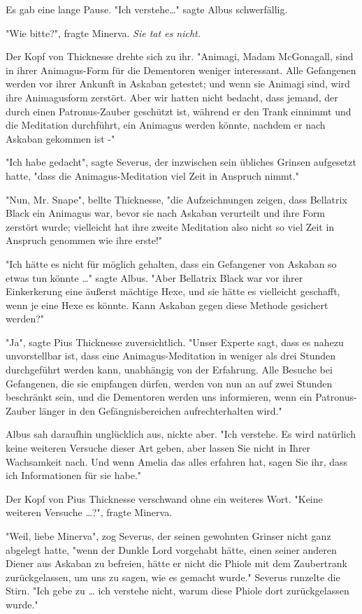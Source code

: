 {Es gab eine lange Pause. "Ich verstehe…" sagte Albus schwerfällig.

"Wie bitte?", fragte Minerva. \emph{Sie tat es nicht.}

Der Kopf von Thicknesse drehte sich zu ihr. "Animagi, Madam McGonagall, sind in ihrer Animagus-Form für die Dementoren weniger interessant. Alle Gefangenen werden vor ihrer Ankunft in Askaban getestet; und wenn sie Animagi sind, wird ihre Animagusform zerstört. Aber wir hatten nicht bedacht, dass jemand, der durch einen Patronus-Zauber geschützt ist, während er den Trank einnimmt und die Meditation durchführt, ein Animagus werden könnte, nachdem er nach Askaban gekommen ist -"

"Ich habe gedacht", sagte Severus, der inzwischen sein übliches Grinsen aufgesetzt hatte, "dass die Animagus-Meditation viel Zeit in Anspruch nimmt."

"Nun, Mr. Snape", bellte Thicknesse, "die Aufzeichnungen zeigen, dass Bellatrix Black ein Animagus war, bevor sie nach Askaban verurteilt und ihre Form zerstört wurde; vielleicht hat ihre zweite Meditation also nicht so viel Zeit in Anspruch genommen wie ihre erste!"

"Ich hätte es nicht für möglich gehalten, dass ein Gefangener von Askaban so etwas tun könnte …" sagte Albus. "Aber Bellatrix Black war vor ihrer Einkerkerung eine äußerst mächtige Hexe, und sie hätte es vielleicht geschafft, wenn je eine Hexe es könnte. Kann Askaban gegen diese Methode gesichert werden?"

"Ja", sagte Pius Thicknesse zuversichtlich. "Unser Experte sagt, dass es nahezu unvorstellbar ist, dass eine Animagus-Meditation in weniger als drei Stunden durchgeführt werden kann, unabhängig von der Erfahrung. Alle Besuche bei Gefangenen, die sie empfangen dürfen, werden von nun an auf zwei Stunden beschränkt sein, und die Dementoren werden uns informieren, wenn ein Patronus-Zauber länger in den Gefängnisbereichen aufrechterhalten wird."

Albus sah daraufhin unglücklich aus, nickte aber. "Ich verstehe. Es wird natürlich keine weiteren Versuche dieser Art geben, aber lassen Sie nicht in Ihrer Wachsamkeit nach. Und wenn Amelia das alles erfahren hat, sagen Sie ihr, dass ich Informationen für sie habe."

Der Kopf von Pius Thicknesse verschwand ohne ein weiteres Wort. "Keine weiteren Versuche …?", fragte Minerva.

"Weil, liebe Minerva", zog Severus, der seinen gewohnten Grinser nicht ganz abgelegt hatte, "wenn der Dunkle Lord vorgehabt hätte, einen seiner anderen Diener aus Askaban zu befreien, hätte er nicht die Phiole mit dem Zaubertrank zurückgelassen, um uns zu sagen, wie es gemacht wurde." Severus runzelte die Stirn. "Ich gebe zu … ich verstehe nicht, warum diese Phiole dort zurückgelassen wurde."

}
